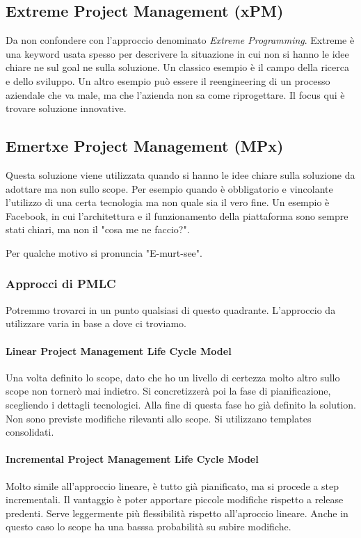 \subsection{Extreme Project Management (xPM)}
Da non confondere con l'approccio denominato \textit{Extreme Programming}. Extreme è una keyword usata spesso per descrivere la situazione in cui non si hanno le idee chiare ne sul goal ne sulla soluzione. Un classico esempio è il campo della ricerca e dello sviluppo. Un altro esempio può essere il reengineering di un processo aziendale che va male, ma che l'azienda non sa come riprogettare. Il focus qui è trovare soluzione innovative.
\subsection{Emertxe Project Management (MPx)}
Questa soluzione viene utilizzata quando si hanno le idee chiare sulla soluzione da adottare ma non sullo scope. Per esempio quando è obbligatorio e vincolante l'utilizzo di una certa tecnologia ma non quale sia il vero fine. Un esempio è Facebook, in cui l'architettura e il funzionamento della piattaforma sono sempre stati chiari, ma non il "cosa me ne faccio?".
\begin{info}
	Per qualche motivo si pronuncia "E-murt-see".
\end{info}
\subsubsection{Approcci di PMLC}
Potremmo trovarci in un punto qualsiasi di questo quadrante. L'approccio da utilizzare varia in base a dove ci troviamo.
\paragraph{Linear Project Management Life Cycle Model}
Una volta definito lo scope, dato che ho un livello di certezza molto altro sullo scope non tornerò mai indietro. Si concretizzerà poi la fase di pianificazione, scegliendo i dettagli tecnologici. Alla fine di questa fase ho già definito la solution. Non sono previste modifiche rilevanti allo scope. Si utilizzano templates consolidati.
\paragraph{Incremental Project Management Life Cycle Model}
Molto simile all'approccio lineare, è tutto già pianificato, ma si procede a step incrementali. Il vantaggio è poter apportare piccole modifiche rispetto a release predenti. Serve leggermente più flessibilità rispetto all'aproccio lineare. Anche in questo caso lo scope ha una basssa probabilità su subire modifiche.
